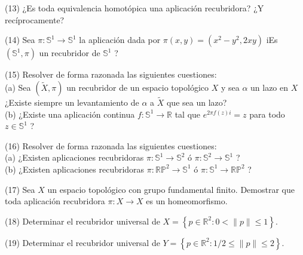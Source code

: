 \documentclass[
  a4paper,
  spanish,
  12pt,
]{scrartcl}
\begin{document}
\begin{ejer}
(13) ¿Es toda equivalencia homotópica una aplicación recubridora? ¿Y recíprocamente?\\
\end{ejer}

\begin{ejer}
(14) Sea $\pi: \mathbb{S}^{1} \rightarrow \mathbb{S}^{1}$ la aplicación dada por $\pi(x, y)=\left(x^{2}-y^{2}, 2 x y\right)$ iEs $\left(\mathbb{S}^{1}, \pi\right)$ un recubridor de $\mathbb{S}^{1}$ ?\\
\end{ejer}

\begin{ejer}
(15) Resolver de forma razonada las siguientes cuestiones:\\
(a) Sea $(\widetilde{X}, \pi)$ un recubridor de un espacio topológico $X$ y sea $\alpha$ un lazo en $X$ ¿Existe siempre un levantamiento de $\alpha$ a $\widetilde{X}$ que sea un lazo?\\
(b) ¿Existe una aplicación continua $f: \mathbb{S}^{1} \rightarrow \mathbb{R}$ tal que $e^{2 \pi f(z) i}=z$ para todo $z \in \mathbb{S}^{1}$ ?\\
\end{ejer}

\begin{ejer}
(16) Resolver de forma razonada las siguientes cuestiones:\\
(a) ¿Existen aplicaciones recubridoras $\pi: \mathbb{S}^{1} \rightarrow \mathbb{S}^{2}$ ó $\pi: \mathbb{S}^{2} \rightarrow \mathbb{S}^{1}$ ?\\
(b) ¿Existen aplicaciones recubridoras $\pi: \mathbb{R} \mathbb{P}^{2} \rightarrow \mathbb{S}^{1}$ ó $\pi: \mathbb{S}^{1} \rightarrow \mathbb{R} \mathbb{P}^{2}$ ?\\
\end{ejer}

\begin{ejer}
(17) Sea $X$ un espacio topológico con grupo fundamental finito. Demostrar que toda aplicación recubridora $\pi: X \rightarrow X$ es un homeomorfismo.\\
\end{ejer}

\begin{ejer}
(18) Determinar el recubridor universal de $X=\left\{p \in \mathbb{R}^{2}: 0<\|p\| \leq 1\right\}$.\\
\end{ejer}

\begin{ejer}
(19) Determinar el recubridor universal de $Y=\left\{p \in \mathbb{R}^{2}: 1 / 2 \leq\|p\| \leq 2\right\}$.\\
\end{ejer}
\end{document}
